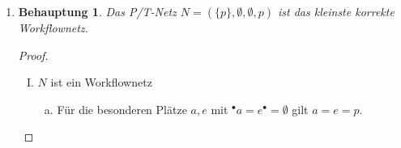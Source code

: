 \documentclass[a4paper]{scrartcl}
\newtheorem*{behaupt}{Behauptung}
\begin{document}
\begin{enumerate}






    \item
        \begin{behaupt}
            Das P/T-Netz $N = ( \{ p \}, \emptyset, \emptyset, p)$ ist das
            kleinste korrekte Workflownetz.
        \end{behaupt}
        \begin{proof} \hfill \\
            \begin{enumerate}[I.]
                \item $N$ ist ein Workflownetz
                    \begin{enumerate}[a)]
                        \item
                            Für die besonderen Plätze $a, e$ mit
                            $^\bullet a = e^\bullet = \emptyset$
                            gilt $a = e = p$.


\end{enumerate}
\end{enumerate}
\end{proof}
\end{enumerate}
\end{document}
